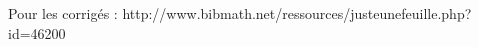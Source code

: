 
\vspace{1em}

Pour les corrigés : http://www.bibmath.net/ressources/justeunefeuille.php?id=46200 

